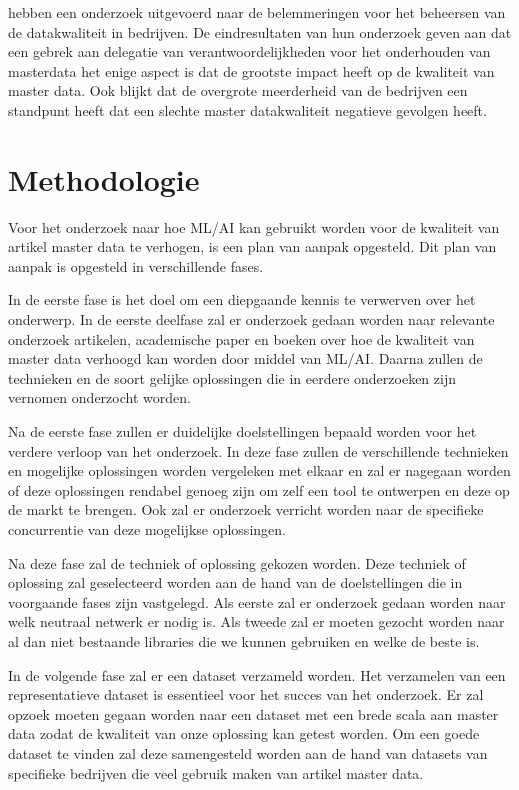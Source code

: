\textcite{ Haug2011a} hebben een onderzoek uitgevoerd naar de belemmeringen voor het beheersen van de datakwaliteit in bedrijven. De eindresultaten van hun onderzoek geven aan dat een gebrek aan delegatie van verantwoordelijkheden voor het onderhouden van masterdata het enige aspect is dat de grootste impact heeft op de kwaliteit van master data. Ook blijkt dat de overgrote meerderheid van de bedrijven een standpunt heeft dat een slechte master datakwaliteit negatieve gevolgen heeft. 

\section{Methodologie}%
\label{sec:methodologie}

Voor het onderzoek naar hoe ML/AI kan gebruikt worden voor de kwaliteit van artikel master data te verhogen, is een plan van aanpak opgesteld. Dit plan van aanpak is opgesteld in verschillende fases. 

In de eerste fase is het doel om een diepgaande kennis te verwerven over het onderwerp. In de eerste deelfase zal er onderzoek gedaan worden naar relevante onderzoek artikelen, academische paper en boeken over hoe de kwaliteit van master data verhoogd kan worden door middel van ML/AI. Daarna zullen de technieken en de soort gelijke oplossingen die in eerdere onderzoeken zijn vernomen onderzocht worden. 

Na de eerste fase zullen er duidelijke doelstellingen bepaald worden voor het verdere verloop van het onderzoek. In deze fase zullen de verschillende technieken en mogelijke oplossingen worden vergeleken met elkaar en zal er nagegaan worden of deze oplossingen rendabel genoeg zijn om zelf een tool te ontwerpen en deze op de markt te brengen. Ook zal er onderzoek verricht worden naar de specifieke concurrentie van deze mogelijkse oplossingen. 

Na deze fase zal de techniek of oplossing gekozen worden. Deze techniek of oplossing zal geselecteerd worden aan de hand van de doelstellingen die in voorgaande fases zijn vastgelegd. Als eerste zal er onderzoek gedaan worden naar welk neutraal netwerk er nodig is. Als tweede zal er moeten gezocht worden naar al dan niet bestaande libraries die we kunnen gebruiken en welke de beste is.

In de volgende fase zal er een dataset verzameld worden. Het verzamelen van een representatieve dataset is essentieel voor het succes van het onderzoek. Er zal opzoek moeten gegaan worden naar een dataset met een brede scala aan master data zodat de kwaliteit van onze oplossing kan getest worden. Om een goede dataset te vinden zal deze samengesteld worden aan de hand van datasets van specifieke bedrijven die veel gebruik maken van artikel master data.

